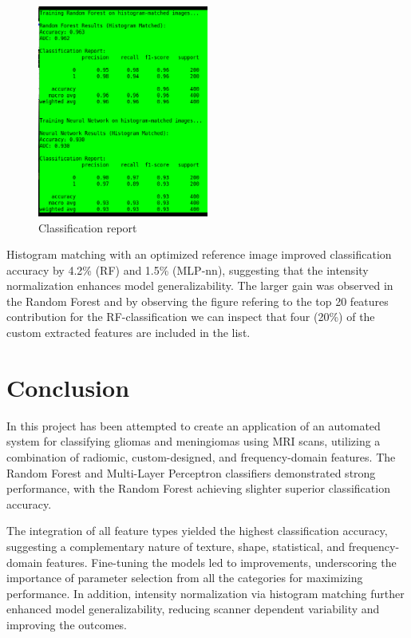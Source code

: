 \documentclass[11pt,a4paper]{article}
\begin{document}
		\begin{figure}[H]
			\centering
			\includegraphics[width=0.5\textwidth]{images/report_hm.png}
			\caption{Classification report}
			\label{fig1:}
		\end{figure}		

Histogram matching with an optimized reference image improved 
classification accuracy by 4.2\% (RF) and 1.5\% (MLP-nn), 
suggesting that the intensity normalization enhances model generalizability. 
The larger gain was observed in the Random Forest and by observing the figure refering to the
top 20 features contribution for the RF-classification we can inspect that four (20\%) of the 
custom extracted features are included in the list.

\section{Conclusion}

In this project has been attempted to create an application of an automated system for 
classifying gliomas and meningiomas using MRI scans, utilizing a combination of radiomic, custom-designed, and frequency-domain features. 
The Random Forest and Multi-Layer Perceptron classifiers 
demonstrated strong performance, 
with the Random Forest achieving slighter superior classification accuracy. 

The integration of all feature types yielded the highest classification accuracy, 
suggesting a complementary nature of texture, shape, statistical, and frequency-domain features.
Fine-tuning the models led to improvements, underscoring the importance of parameter selection from all the categories for maximizing performance.
In addition, intensity normalization via histogram matching 
further enhanced model generalizability, 
reducing scanner dependent variability 
and improving the outcomes.




 
\end{document}
